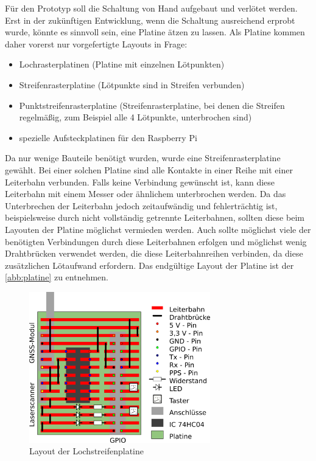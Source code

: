 \documentclass[a4paper,12pt,bibliography=totoc, listof=totoc,titlepage,pointlessnumbers]{scrreprt}
\begin{document}
Für den Prototyp soll die Schaltung von Hand aufgebaut und verlötet werden. Erst in der zukünftigen Entwicklung, wenn die Schaltung ausreichend erprobt wurde, könnte es sinnvoll sein, eine Platine ätzen zu lassen. Als Platine kommen daher vorerst nur vorgefertigte Layouts in Frage:

\begin{itemize}
 \item Lochrasterplatinen (Platine mit einzelnen Lötpunkten)
 \item Streifenrasterplatine (Lötpunkte sind in Streifen verbunden)
 \item Punktstreifenrasterplatine (Streifenrasterplatine, bei denen die Streifen regelmäßig, zum Beispiel alle 4 Lötpunkte, unterbrochen sind)
 \item spezielle Aufsteckplatinen für den Raspberry Pi
\end{itemize}


Da nur wenige Bauteile benötigt wurden, wurde eine Streifenrasterplatine gewählt. Bei einer solchen Platine sind alle Kontakte in einer Reihe mit einer Leiterbahn verbunden. Falls keine Verbindung gewünscht ist, kann diese Leiterbahn mit einem Messer oder ähnlichem unterbrochen werden. Da das Unterbrechen der Leiterbahn jedoch zeitaufwändig und fehlerträchtig ist, beispielsweise durch nicht vollständig getrennte Leiterbahnen, sollten diese beim Layouten der Platine möglichst vermieden werden. Auch sollte möglichst viele der benötigten Verbindungen durch diese Leiterbahnen erfolgen und möglichst wenig Drahtbrücken verwendet werden, die diese Leiterbahnreihen verbinden, da diese zusätzlichen Lötaufwand erfordern. Das endgültige Layout der Platine ist der \autoref{abb:platine} zu entnehmen.

\begin{figure}[ht!]
 \centering
 \includegraphics[width=0.7\textwidth]{img/platine.png}
 \caption{Layout der Lochstreifenplatine}
 \label{abb:platine}
\end{figure}
\end{document}
